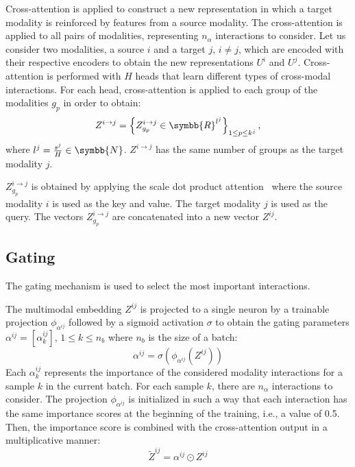 \documentclass[../main.tex]{subfiles}
\begin{document}
	  Cross-attention is applied to construct a new representation in which a target modality is reinforced by features from a source modality.
	  The cross-attention is applied to all pairs of modalities, representing \(n_{\alpha}\) interactions to consider.
	  Let us consider two modalities, a source \(i\) and a target \(j\), \(i \neq j\), which are encoded with their respective encoders to obtain the new representations \(U^i\) and \(U^j\).
	  Cross-attention is performed with \(H\) heads that learn different types of cross-modal interactions.
	  For each head, cross-attention is applied to each group of the modalities \(g_p\) in order to obtain:
	  \[ Z^{i\rightarrow j} = \left\{ Z^{i\rightarrow j}_{g_p} \in \symbb{R}^{l^j} \right\}_{1 \leq p \leq k^j}\text{,}\]
	  where \(l^j = \frac{s^j}{H} \in \symbb{N}\).
	  \( Z^{i\rightarrow j}\) has the same number of groups as the target modality \(j\).

	  \(Z^{i\rightarrow j}_{g_p}\) is obtained by applying the scale dot product attention~\cite{AttentionAllYouNeed} where the source modality \(i\) is used as the key and value.
	  The target modality \(j\) is used as the query.
	  The vectors \(Z^{i\rightarrow j}_{g_p}\) are concatenated into a new vector \(Z^{ij}\).

	\subsection{Gating}
	  The gating mechanism is used to select the most important interactions.

	  The multimodal embedding \(Z^{ij}\) is projected to a single neuron by a trainable projection \(\phi_{\alpha^{ij}}\) followed by a sigmoid activation \(\sigma\) to obtain the gating parameters \(\alpha^{ij} = \left[\alpha^{ij}_{k}\right]\), \(1 \leq k \leq n_b\) where \(n_b\) is the size of a batch:
	  \begin{equation}
	    \alpha^{ij} = \sigma \left( \phi_{\alpha^{ij}}\left( Z^{ij} \right)\right)
	    \label{eq:gate_alpha}
	  \end{equation}
	  Each \(\alpha^{ij}_{k}\) represents the importance of the considered modality interactions for a sample \(k\) in the current batch.
	  For each sample \(k\), there are \(n_{\alpha}\) interactions to consider.
	  The projection \(\phi_{\alpha^{ij}}\) is initialized in such a way that each interaction has the same importance scores at the beginning of the training, i.e., a value of 0.5.
	  Then, the importance score is combined with the cross-attention output in a multiplicative manner:
	  \[ \tilde{Z}^{ij} = \alpha^{ij} \odot Z^{ij} \]
\end{document}
